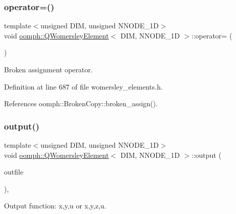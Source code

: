 \subsubsection{\texorpdfstring{operator=()}{operator=()}}
{\footnotesize\ttfamily template$<$unsigned D\+IM, unsigned N\+N\+O\+D\+E\+\_\+1D$>$ \\
void \hyperlink{classoomph_1_1QWomersleyElement}{oomph\+::\+Q\+Womersley\+Element}$<$ D\+IM, N\+N\+O\+D\+E\+\_\+1D $>$\+::operator= (\begin{DoxyParamCaption}\item[{const \hyperlink{classoomph_1_1QWomersleyElement}{Q\+Womersley\+Element}$<$ D\+IM, N\+N\+O\+D\+E\+\_\+1D $>$ \&}]{ }\end{DoxyParamCaption})\hspace{0.3cm}{\ttfamily [inline]}}



Broken assignment operator. 



Definition at line 687 of file womersley\+\_\+elements.\+h.



References oomph\+::\+Broken\+Copy\+::broken\+\_\+assign().

\mbox{\label{classoomph_1_1QWomersleyElement_a5a8951b6a947e120821c1a83048975d4}} 
\subsubsection{\texorpdfstring{output()}{output()}\hspace{0.1cm}{\footnotesize\ttfamily [1/4]}}
{\footnotesize\ttfamily template$<$unsigned D\+IM, unsigned N\+N\+O\+D\+E\+\_\+1D$>$ \\
void \hyperlink{classoomph_1_1QWomersleyElement}{oomph\+::\+Q\+Womersley\+Element}$<$ D\+IM, N\+N\+O\+D\+E\+\_\+1D $>$\+::output (\begin{DoxyParamCaption}\item[{std\+::ostream \&}]{outfile }\end{DoxyParamCaption})\hspace{0.3cm}{\ttfamily [inline]}, {\ttfamily [virtual]}}



Output function\+: x,y,u or x,y,z,u. 



